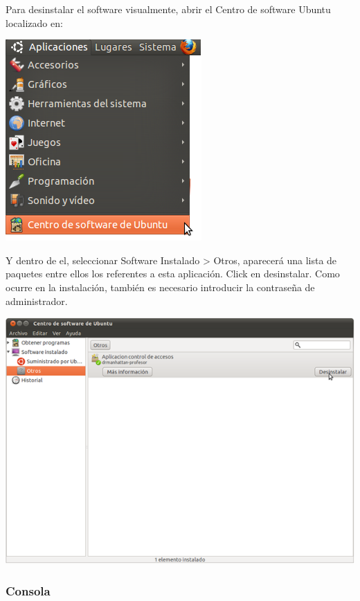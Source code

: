 \documentclass[11pt]{article}
\begin{document}
Para desinstalar el software visualmente, abrir el Centro de software Ubuntu localizado en:

\begin{center}

    \includegraphics{imagenes/localLizacionCentroSoftware}

\end{center}

Y dentro de el, seleccionar Software Instalado > Otros, aparecerá una lista de paquetes entre ellos los referentes a esta aplicación. Click en desinstalar. Como ocurre en la instalación, también es necesario introducir la contraseña de administrador.

\begin{center}

    \includegraphics[width=.90\linewidth]{imagenes/desinstalar}

\end{center}

\subsubsection{Consola}
\end{document}
